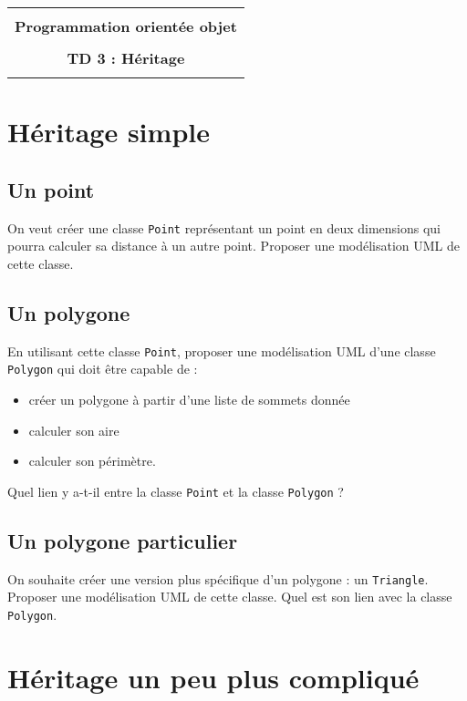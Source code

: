 \documentclass[12pt]{article}
\begin{document}
    \begin{center}
      \begin{tabular}{c}
      \hline
    \\
        {\bf \textsf {\Large Programmation orientée objet}}\\
    \\
        {\bf \textsf {\Large TD 3 : Héritage}}\\
    \\
        \hline
      \end{tabular}
    \end{center}
    \vspace{15mm}

\section{Héritage simple}
\subsection{Un point}
On veut créer une classe \texttt{Point} représentant un point en deux dimensions qui pourra calculer sa distance à un autre point. Proposer une modélisation UML de cette classe.\\

\subsection{Un polygone}
En utilisant cette classe \texttt{Point}, proposer une modélisation UML d'une classe \texttt{Polygon} qui doit être capable de :
\begin{itemize}
	\item créer un polygone à partir d'une liste de sommets donnée
	\item calculer son aire
	\item calculer son périmètre.
\end{itemize}
Quel lien y a-t-il entre la classe \texttt{Point} et la classe \texttt{Polygon} ?

\subsection{Un polygone particulier}
On souhaite créer une version plus spécifique d'un polygone : un \texttt{Triangle}. Proposer une modélisation UML de cette classe. Quel est son lien avec la classe \texttt{Polygon}.


\section{Héritage un peu plus compliqué}
\end{document}
